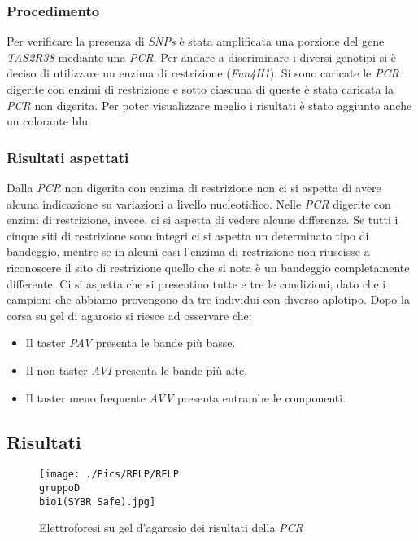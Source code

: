 		\subsubsection*{Procedimento}
		Per verificare la presenza di \emph{SNPs} è stata amplificata una porzione del gene \emph{TAS2R38} mediante una \emph{PCR}.
		Per andare a discriminare i diversi genotipi si è deciso di utilizzare un enzima di restrizione (\emph{Fun4H1}). 
		Si sono caricate le \emph{PCR} digerite con enzimi di restrizione e sotto ciascuna di queste è stata caricata la \emph{PCR} non digerita. 
		Per poter visualizzare meglio i risultati è stato aggiunto anche un colorante blu. 
	   
		\subsubsection*{Risultati aspettati}
		Dalla \emph{PCR} non digerita con enzima di restrizione non ci si aspetta di avere alcuna indicazione su variazioni a livello nucleotidico. 
		Nelle \emph{PCR} digerite con enzimi di restrizione, invece, ci si aspetta di vedere alcune differenze. 
		Se tutti i cinque siti di restrizione sono integri ci si aspetta un determinato tipo di bandeggio, mentre se in alcuni casi l'enzima di restrizione non riuscisse a riconoscere il sito di restrizione quello che si nota è un bandeggio completamente differente. 
		Ci si aspetta che si presentino tutte e tre le condizioni, dato che i campioni che abbiamo provengono da tre individui con diverso aplotipo. 
		Dopo la corsa su gel di agarosio si riesce ad osservare che:
		\begin{itemize}
			\item Il taster \emph{PAV} presenta le bande più basse.
			\item Il non taster \emph{AVI} presenta le bande più alte.
			\item Il taster meno frequente \emph{AVV} presenta entrambe le componenti. 
		\end{itemize}
	
	\subsection*{Risultati}
	\begin{figure}[H]
		\centering
		\texttt{[image: ./Pics/RFLP/RFLP\\ gruppoD\\ bio1(SYBR Safe).jpg]}
		\caption{Elettroforesi su gel d'agarosio dei risultati della \emph{PCR}}
		\label{fig10}
	\end{figure}

